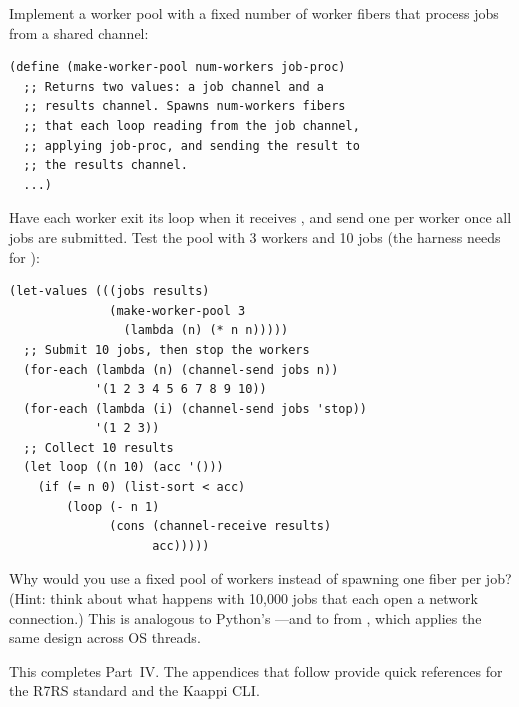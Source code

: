 \begin{exercise}
Implement a worker pool with a fixed number of worker fibers that process jobs from a shared channel:

\begin{lstlisting}
(define (make-worker-pool num-workers job-proc)
  ;; Returns two values: a job channel and a
  ;; results channel. Spawns num-workers fibers
  ;; that each loop reading from the job channel,
  ;; applying job-proc, and sending the result to
  ;; the results channel.
  ...)
\end{lstlisting}

Have each worker exit its loop when it receives , and send one  per worker once all jobs are submitted. Test the pool with 3 workers and 10 jobs (the harness needs  for ):

\begin{lstlisting}
(let-values (((jobs results)
              (make-worker-pool 3
                (lambda (n) (* n n)))))
  ;; Submit 10 jobs, then stop the workers
  (for-each (lambda (n) (channel-send jobs n))
            '(1 2 3 4 5 6 7 8 9 10))
  (for-each (lambda (i) (channel-send jobs 'stop))
            '(1 2 3))
  ;; Collect 10 results
  (let loop ((n 10) (acc '()))
    (if (= n 0) (list-sort < acc)
        (loop (- n 1)
              (cons (channel-receive results)
                    acc)))))
\end{lstlisting}

Why would you use a fixed pool of workers instead of spawning one fiber per job? (Hint: think about what happens with 10,000 jobs that each open a network connection.) This is analogous to Python's ---and to  from , which applies the same design across OS threads.
\end{exercise}

This completes Part~IV. The appendices that follow provide quick references for the R7RS standard and the Kaappi CLI.

\chapterend
